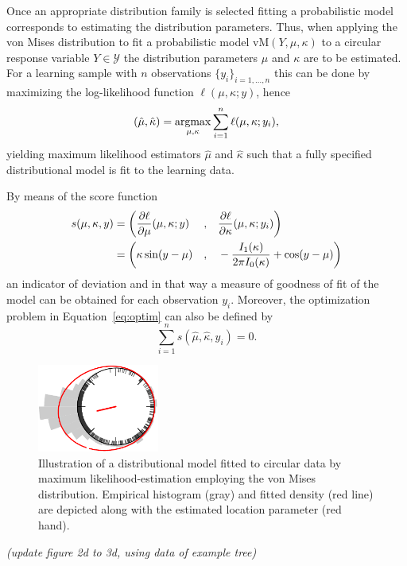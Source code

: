 \documentclass[nojss]{jss}
\newcommand{\fixme}[1]{\emph{\marginpar{FIXME} (#1)}}
\newcommand{\argmax}{\operatorname{argmax}\displaylimits}
\numberwithin{equation}{section}
\begin{document}
Once an appropriate distribution family is selected fitting a probabilistic model corresponds to
estimating the distribution parameters. Thus, when applying the von Mises distribution to fit a 
probabilistic model $\text{vM}(Y, \mu, \kappa)$ to a circular response variable $Y \in \mathcal{Y}$ 
the distribution parameters $\mu$ and $\kappa$ are to be estimated.
For a learning sample with $n$ observations $\{y_i\}_{i=1,\ldots,n}$ this can be done by 
maximizing the log-likelihood function $\ell(\mu, \kappa; y)$, hence
\begin{equation}\label{eq:optim}
(\hat{\mu},\hat{\kappa}) = \argmax_{\mu,\kappa} \sum_{i=1}^n \ell(\mu, \kappa; y_i),
\end{equation}
yielding maximum likelihood estimators $\hat{\mu}$ and $\hat{\kappa}$ such that a fully specified 
distributional model is fit to the learning data.

By means of the score function
\begin{equation}
\label{eq:scores}
\begin{aligned}
s(\mu, \kappa, y) &= \bigg(\frac{\partial \ell}{\partial \mu}(\mu,\kappa; y)
\smallskip &,
\quad & \frac{\partial \ell}{\partial \kappa}(\mu,\kappa; y_i) \bigg) 
\\
&= \bigg(\kappa \sin(y-\mu)
\smallskip &,
\quad &-\frac{I_1(\kappa)}{2\pi I_0(\kappa)}+\cos(y-\mu) \bigg)
\end{aligned}
\end{equation}
an indicator of deviation and in that way a measure of goodness of fit of the model can be obtained 
for each observation $y_i$. Moreover, the optimization problem in Equation~\ref{eq:optim} can also 
be defined by 
\begin{equation}
\sum_{i = 1}^n s(\hat{\mu}, \hat{\kappa}, y_i) = 0.
\end{equation}

\begin{figure}[t]
\centering
\includegraphics[width=4cm]{density_vM.pdf}
\caption{Illustration of a distributional model fitted to circular data by maximum likelihood-estimation
employing the von Mises distribution. Empirical histogram (gray) and fitted density (red line) are depicted
along with the estimated location parameter (red hand).
}
\label{fig:density_vM} 
\end{figure}
\fixme{update figure 2d to 3d, using data of example tree}
\end{document}

